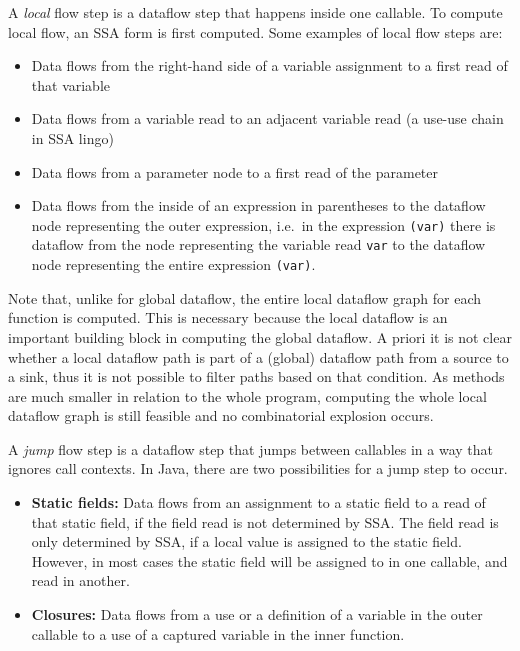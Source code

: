 A \emph{local} flow step is a dataflow step that happens inside one callable.
To compute local flow, an SSA form is first computed.
Some examples of local flow steps are:
\begin{itemize}
    \item Data flows from the right-hand side of a variable assignment to a 
    first read of that variable
    \item Data flows from a variable read to an adjacent variable read (a use-use chain in SSA lingo)
    \item Data flows from a parameter node to a first read of the parameter
    \item Data flows from the inside of an expression in parentheses to the dataflow node
    representing the outer expression, i.e.\ in the expression \texttt{(var)} there is dataflow from the node 
    representing the variable read \texttt{var} to the dataflow node representing the entire expression \texttt{(var)}.
\end{itemize}
Note that, unlike for global dataflow, the entire local dataflow graph for each function 
is computed.
This is necessary because the local dataflow is an important building block in computing
the global dataflow.
A priori it is not clear whether a local dataflow path is part of a (global) dataflow path
from a source to a sink, thus it is not possible to filter paths based on that condition.
As methods are much smaller in relation to the whole program, computing the whole local 
dataflow graph is still feasible and no combinatorial explosion occurs.

A \emph{jump} flow step is a dataflow step that jumps between callables 
in a way that ignores call contexts.
In Java, there are two possibilities for a jump step to occur.
\begin{itemize}
    \item \textbf{Static fields:} Data flows from an assignment to a static field to a read of that static field,
    if the field read is not determined by SSA.
    The field read is only determined by SSA, if a local value is assigned to the static field.
    However, in most cases the static field will be assigned to in one callable, and read 
    in another.
    \item \textbf{Closures:} Data flows from a use or a definition of a variable in the outer callable 
    to a use of a captured variable in the inner function.
\end{itemize}

